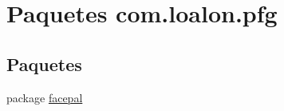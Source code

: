 \hypertarget{namespacecom_1_1loalon_1_1pfg}{}\section{Paquetes com.\+loalon.\+pfg}
\label{namespacecom_1_1loalon_1_1pfg}
\subsection*{Paquetes}
\begin{DoxyCompactItemize}
\item 
package \mbox{\hyperlink{namespacecom_1_1loalon_1_1pfg_1_1facepal}{facepal}}
\end{DoxyCompactItemize}
